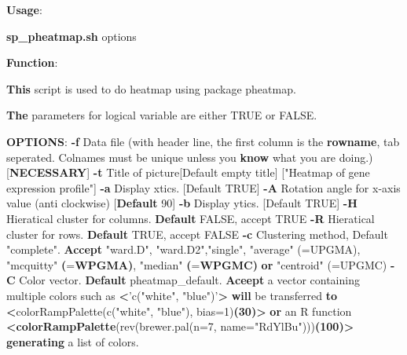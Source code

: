 \documentclass[]{article}
\newenvironment{Shaded}{\begin{snugshade}}{\end{snugshade}}
\newcommand{\KeywordTok}[1]{\textcolor[rgb]{0.13,0.29,0.53}{\textbf{{#1}}}}
\newcommand{\StringTok}[1]{\textcolor[rgb]{0.31,0.60,0.02}{{#1}}}
\newcommand{\OtherTok}[1]{\textcolor[rgb]{0.56,0.35,0.01}{{#1}}}
\newcommand{\NormalTok}[1]{{#1}}
\numberwithin{figure}{section}
\numberwithin{table}{section}
\theoremstyle{definition}
\theoremstyle{definition}
\theoremstyle{definition}
\theoremstyle{remark}
\begin{document}
\begin{Shaded}
\begin{Highlighting}[]
\KeywordTok{Usage}\NormalTok{:}

\KeywordTok{sp_pheatmap.sh} \NormalTok{options}

\KeywordTok{Function}\NormalTok{:}

\KeywordTok{This} \NormalTok{script is used to do heatmap using package pheatmap.}

\KeywordTok{The} \NormalTok{parameters for logical variable are either TRUE or FALSE.}

\KeywordTok{OPTIONS}\NormalTok{:}
    \KeywordTok{-f}  \NormalTok{Data file (with header line, the first column is the}
        \KeywordTok{rowname}\NormalTok{, tab seperated. Colnames must be unique unless you}
        \KeywordTok{know} \NormalTok{what you are doing.)[}\KeywordTok{NECESSARY}\NormalTok{]}
    \KeywordTok{-t}  \NormalTok{Title of picture[Default empty title]}
        \NormalTok{[}\StringTok{"Heatmap of gene expression profile"}\NormalTok{]}
    \KeywordTok{-a}  \NormalTok{Display xtics. [Default TRUE]}
    \KeywordTok{-A}  \NormalTok{Rotation angle for x-axis value (anti clockwise)}
        \NormalTok{[}\KeywordTok{Default} \NormalTok{90]}
    \KeywordTok{-b}  \NormalTok{Display ytics. [Default TRUE]}
    \KeywordTok{-H}  \NormalTok{Hieratical cluster for columns.}
        \KeywordTok{Default} \NormalTok{FALSE, accept TRUE}
    \KeywordTok{-R}  \NormalTok{Hieratical cluster for rows.}
        \KeywordTok{Default} \NormalTok{TRUE, accept FALSE}
    \KeywordTok{-c}  \NormalTok{Clustering method, Default }\StringTok{"complete"}\NormalTok{. }
        \KeywordTok{Accept} \StringTok{"ward.D"}\NormalTok{, }\StringTok{"ward.D2"}\NormalTok{,}\StringTok{"single"}\NormalTok{, }\StringTok{"average"} \NormalTok{(=UPGMA), }
        \StringTok{"mcquitty"} \KeywordTok{(}\NormalTok{=}\KeywordTok{WPGMA)}\NormalTok{, }\StringTok{"median"} \KeywordTok{(}\NormalTok{=}\KeywordTok{WPGMC)} \KeywordTok{or} \StringTok{"centroid"} \NormalTok{(=UPGMC)}
    \KeywordTok{-C}  \NormalTok{Color vector. }
        \KeywordTok{Default} \NormalTok{pheatmap_default. }
        \KeywordTok{Aceept} \NormalTok{a vector containing multiple colors such as }
        \KeywordTok{<}\StringTok{'c("white", "blue")'}\KeywordTok{>} \KeywordTok{will} \NormalTok{be transferred }
        \KeywordTok{to} \KeywordTok{<}\NormalTok{colorRampPalette(c(}\StringTok{"white"}\NormalTok{, }\StringTok{"blue"}\NormalTok{), }\OtherTok{bias=}\NormalTok{1)}\KeywordTok{(30)>}
        \KeywordTok{or} \NormalTok{an R function }
        \KeywordTok{<colorRampPalette}\NormalTok{(rev(brewer.pal(n=7, name=}\StringTok{"RdYlBu"}\NormalTok{)))}\KeywordTok{(100)>}
        \KeywordTok{generating} \NormalTok{a list of colors.}
        

\end{Highlighting}
\end{Shaded}
\end{document}
